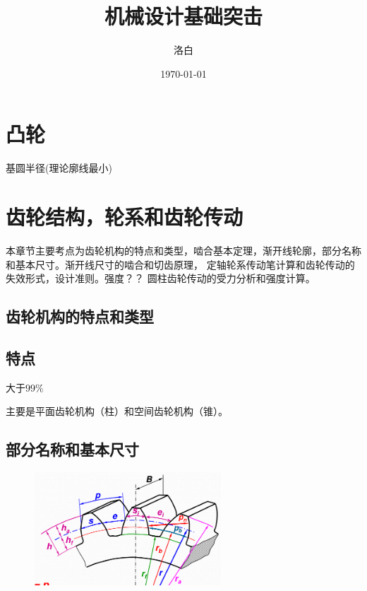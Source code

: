 \documentclass[twocolumn]{ctexart}
\title{机械设计基础突击}
\author{洛白}
\date{\today}
\begin{document}


\setlength{\parskip}{0em}
\renewcommand{\baselinestretch}{1.53}

\section{凸轮}
基圆半径(理论廓线最小)

\section{齿轮结构，轮系和齿轮传动}
本章节主要考点为齿轮机构的特点和类型，啮合基本定理，渐开线轮廓，部分名称和基本尺寸。渐开线尺寸的啮合和切齿原理，
定轴轮系传动笔计算和齿轮传动的失效形式，设计准则。强度？？
圆柱齿轮传动的受力分析和强度计算。
\subsection{齿轮机构的特点和类型}
\subsection{特点}
\begin{description}[leftmargin=1.7cm,style=nextline,nosep]%
    \item[传动比准确，传动平稳]
    \item[效率高] 大于$99\%$
\end{description}
主要是平面齿轮机构（柱）和空间齿轮机构（锥）。
\subsection{部分名称和基本尺寸}
        \begin{figure}[H]
            \centering
            \includegraphics[width=7cm]{img/1.png}
            \end{figure}
\end{document}
